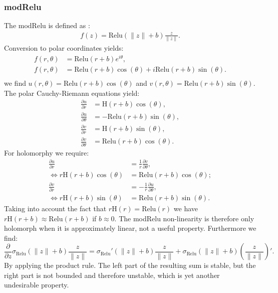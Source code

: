 \documentclass{article}
\begin{document}
\subsubsection{modRelu}
\label{sec:modRelu}
The modRelu is defined as \cite{Arjovsky}:
\begin{align}
f(z) = \text{Relu}(\|z\| + b) \frac{z}{\|z\|}.
\end{align}
Conversion to polar coordinates yields:
\begin{align}
f(r, \theta) &= \text{Relu}(r + b)e^{i\theta}, \\
f(r, \theta) &= \text{Relu}(r + b)\cos(\theta) + i\text{Relu}(r + b)\sin(\theta). \\
\end{align}
we find $u(r, \theta) = \text{Relu}(r + b)\cos(\theta)$ and $v(r, \theta) = \text{Relu}(r + b)\sin(\theta)$. The polar Cauchy-Riemann equations yield:
\begin{align}
\frac{\partial u}{\partial r} &= \text{H}(r + b)\cos(\theta),  \\
\frac{\partial u}{\partial \theta} &= -\text{Relu}(r + b)\sin(\theta), \\
\frac{\partial v}{\partial r} &= \text{H}(r + b)\sin(\theta), \\
\frac{\partial v}{\partial \theta} &= \text{Relu}(r + b)\cos(\theta).
\end{align}
For holomorphy we require:
\begin{align}
\frac{\partial u}{\partial r} &= \frac{1}{r} \frac{\partial v}{\partial \theta}, \\
\Leftrightarrow r\text{H}(r + b)\cos(\theta) &= \text{Relu}(r + b)\cos(\theta);\\
\frac{\partial v}{\partial r} &= - \frac{1}{r} \frac{\partial u}{\partial \theta}, \\ 
\Leftrightarrow r\text{H}(r + b)\sin(\theta) &= \text{Relu}(r + b)\sin(\theta).
\end{align}
Taking into account the fact that $r\text{H}(r) = \text{Relu}(r)$ we have $r\text{H}(r + b) \approx \text{Relu}(r + b)$ if $b \approx 0$. The modRelu non-linearity is therefore only holomorph when it is approximately linear, not a useful property. Furthermore we find:
\begin{equation}
\frac{\partial}{\partial z}\sigma_{\text{Relu}}(\|z\| + b) \frac{z}{\|z\|} = \sigma_{\text{Relu}}'(\|z\| + b) \frac{z}{\|z\|} + \sigma_{\text{Relu}}(\|z\| + b) (\frac{z}{\|z\|})'.
\end{equation}
By applying the product rule. The left part of the resulting sum is stable, but the right part is not bounded and therefore unstable, which is yet another undesirable property.
\end{document}

